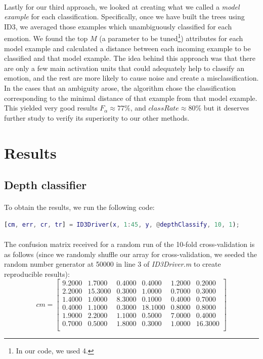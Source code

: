 \documentclass[a4paper,12pt,oneside,final]{report}
\begin{document}
\paragraph{}
Lastly for our third approach, we looked at creating what we called a \emph{model example} for each classification.  Specifically, once we have built the trees using ID3, we averaged those examples which unambiguously classified for each emotion.  We found the top $M$ (a parameter to be tuned\footnote{In our code, we used 4.}) attributes for each model example and calculated a distance between each incoming example to be classified and that model example.  The idea behind this approach was that there are only a few main activation units that could adequately help to classify an emotion, and the rest are more likely to cause noise and create a misclassification.  In the cases that an ambiguity arose, the algorithm chose the classification corresponding to the minimal distance of that example from that model example.  This yielded very good results $F_{\alpha}\approx 77\%$, and $classRate \approx 80\%$ but it deserves further study to verify its superiority to our other methods.

\section{Results}
\subsection{Depth classifier}
\paragraph{}
To obtain the results, we run the following code:
\newline
\begin{lstlisting}[language=MATLAB, frame=single]
[cm, err, cr, tr] = ID3Driver(x, 1:45, y, @depthClassify, 10, 1);
\end{lstlisting}
\paragraph{}
The confusion matrix received for a random run of the 10-fold cross-validation is as follows (since we randomly shuffle our array for cross-validation, we seeded the random number generator at 50000 in line 3 of \emph{ID3Driver.m} to create reproducible results):
\[
cm = \left[\begin{array}{cccccc}
9.2000  &  1.7000  &  0.4000  &  0.4000 &   1.2000    &0.2000 \\
    2.2000   &15.3000&    0.3000&    1.0000&    0.7000 &    0.3000 \\
    1.4000    &1.0000    &8.3000    &0.1000    &0.4000   & 0.7000 \\
    0.4000    &1.1000    &0.3000   &18.1000   & 0.8000   & 0.8000 \\
    1.9000    &2.2000    &1.1000    &0.5000    &7.0000    &0.4000 \\
    0.7000    &0.5000    &1.8000    &0.3000    &1.0000   &16.3000 \\

\end{array}
\right]
\]
\end{document}
